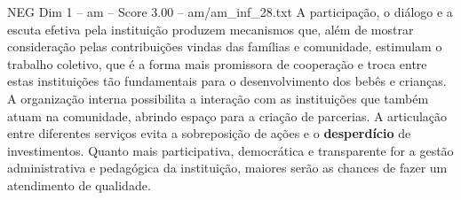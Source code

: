 \begin{textsample}{NEG Dim 1 – am – Score 3.00 – am/am\_inf\_28.txt}
A participação, o diálogo e a escuta efetiva pela instituição produzem mecanismos que, além de mostrar consideração pelas contribuições vindas das famílias e comunidade, estimulam o trabalho coletivo, que é a forma mais promissora de cooperação e troca entre estas instituições tão fundamentais para o desenvolvimento dos bebês e crianças.
A organização interna possibilita a interação com as instituições que também atuam na comunidade, abrindo espaço para a criação de parcerias.
A articulação entre diferentes serviços evita a sobreposição de ações e o \textbf{desperdício} de investimentos.
Quanto mais participativa, democrática e transparente for a gestão administrativa e pedagógica da instituição, maiores serão as chances de fazer um atendimento de qualidade.

\end{textsample}
